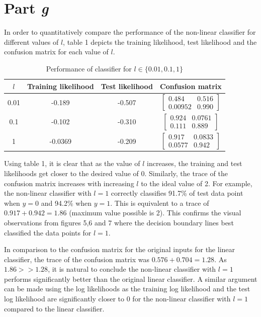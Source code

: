 \documentclass[twocolumn]{article}
\begin{document}
\section{Part \textit{g}}

In order to quantitatively compare the performance of the non-linear classifier for different values of $l$, table 1 depicts the training likelihood, test likelihood and the confusion matrix for each value of $l$.

\setlength{\tabcolsep}{2pt}
\setlength{\arrayrulewidth}{0.5mm}
\renewcommand{\arraystretch}{1.5}
\begin{table}[h!]
    \centering
    \begin{tabular}{|c|c|c|c|}
    \hline
    $l$ & Training likelihood & Test likelihood & Confusion matrix \\
    \hline\hline
       0.01  &  -0.189 & -0.507 & $\begin{bmatrix} 0.484 & 0.516 \\ 0.00952 & 0.990 \end{bmatrix}$\\ \hline
      0.1  &  -0.102 & -0.310 & $\begin{bmatrix} 0.924 & 0.0761 \\ 0.111 & 0.889 \end{bmatrix}$\\ \hline
       1  &  -0.0369 & -0.209 & $\begin{bmatrix} 0.917 & 0.0833 \\ 0.0577 & 0.942 \end{bmatrix}$\\ \hline   
    \end{tabular}
    \caption{Performance of classifier for $l\in\{0.01,0.1,1\}$}
    \label{tab:my_label}
\end{table}

Using table 1, it is clear that as the value of $l$ increases, the training and test likelihoods get closer to the desired value of 0. Similarly, the trace of the confusion matrix increases with increasing $l$ to the ideal value of 2. For example, the non-linear classifier with $l=1$ correctly classifies 91.7\% of test data point when $y=0$ and 94.2\% when $y=1$. This is equivalent to a trace of $0.917+0.942=1.86$ (maximum value possible is 2). This confirms the visual observations from figures 5,6 and 7 where the decision boundary lines best classified the data points for $l=1$.

In comparison to the confusion matrix for the original inputs for the linear classifier, the trace of the confusion matrix was $0.576+0.704=1.28$. As $1.86>>1.28$, it is natural to conclude the non-linear classifier with $l=1$ performs significantly better than the original linear classifier. A similar argument can be made using the log likelihoods as the training log likelihood and the test log likelihood are significantly closer to 0 for the non-linear classifier with $l=1$ compared to the linear classifier.
\end{document}
